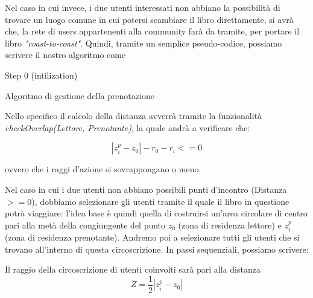 \begin{itemize}
\begin{itemize}
		Nel caso in cui invece, i due utenti interessati non abbiano la possibilità di trovare un luogo comune in cui potersi scambiare il libro direttamente, si avrà che, la rete di users appartenenti alla community farà da tramite, per portare il libro \textit{"coast-to-coast"}.
		Quindi, tramite un semplice pseudo-codice, possiamo scrivere il nostro algoritmo come
	
		\begin{algorithm}[H]
			\SetAlgoLined
			Step 0 (intilization)\;
			\caption{Algoritmo di gestione della prenotazione}
		\end{algorithm}
		
		
		Nello specifico il calcolo della distanza avverrà tramite la funzionalità \textit{checkOverlap(Lettore, Prenotante)}, la quale andrà a verificare che:
		
		{\LARGE \begin{equation}
			|z^{p}_{i}-z_{0}|-r_{0}-r_{i}<=0
		\end{equation}}
		
		ovvero che i raggi d'azione si sovrappongano o meno.
		
		Nel caso in cui i due utenti non abbiano possibili punti d'incontro (Distanza $>= 0 $), dobbiamo selezionare gli utenti tramite il quale il libro in questione potrà viaggiare: l'idea base è quindi quella di costruirsi un'area circolare di centro pari alla metà della congiungente del punto $ z_{0} $ (zona di residenza lettore) e $ z^{p}_{i} $ (zona di residenza prenotante).
		Andremo poi a selezionare tutti gli utenti che si trovano all'interno di questa circoscrizione.
		In passi sequenziali, possiamo scrivere:
		
		\begin{algorithm}[H]
			\SetAlgoLined
			
			
			Il raggio della circoscrizione di utenti coinvolti sarà pari alla distanza
			\[ \bar{Z} = \dfrac{1}{2} |z^{p}_{i}-z_{0}| \]
\end{algorithm}
\end{itemize}
\end{itemize}
